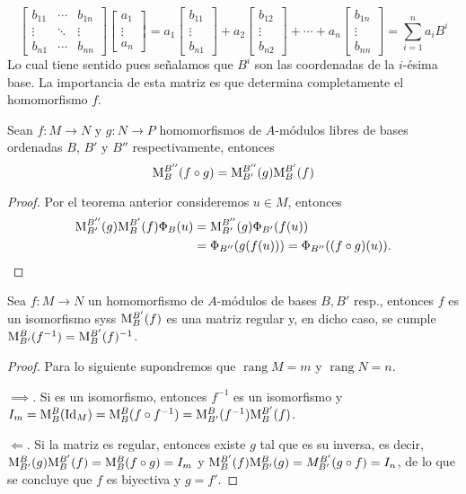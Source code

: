 \documentclass[11pt,oneside]{book}
\DeclareMathOperator{\rang}{rang}
\DeclareMathOperator{\Id}{Id}
\begin{document}
$$\begin{bmatrix}
b_{11} & \cdots & b_{1n}\\
\vdots & \ddots & \vdots\\
b_{n1} & \cdots & b_{nn}
\end{bmatrix}
\begin{bmatrix}
a_1\\\vdots\\a_n
\end{bmatrix}
=
a_1\begin{bmatrix}
b_{11}\\\vdots\\b_{n1}
\end{bmatrix}+
a_2\begin{bmatrix}
b_{12}\\\vdots\\b_{n2}
\end{bmatrix}+\cdots+
a_n\begin{bmatrix}
b_{1n}\\\vdots\\b_{nn}
\end{bmatrix}
=\sum_{i=1}^n a_iB^i$$
Lo cual tiene sentido pues señalamos que $B^i$ son las coordenadas de la $i$-ésima base. La importancia de esta matriz es que determina completamente el homomorfismo $f$.
\begin{thm}
Sean $f:M\rightarrow N$ y $g:N\rightarrow P$ homomorfismos de $A$-módulos libres de bases ordenadas $B$, $B'$ y $B''$ respectivamente, entonces
$${\rm M}_B^{B''}(f\circ g)={\rm M}_{B'}^{B''}(g){\rm M}_B^{B'}(f)$$
\end{thm}
\begin{proof}
Por el teorema anterior consideremos $u\in M$, entonces
\begin{align*}
{\rm M}_{B'}^{B''}(g){\rm M}_B^{B'}(f)\Phi_B(u)&={\rm M}_{B'}^{B''}(g)\Phi_{B'}(f(u))\\
&=\Phi_{B''}(g(f(u)))=\Phi_{B''}((f\circ g)(u)).
\end{align*}
\end{proof}
\begin{thm}
Sea $f:M\rightarrow N$ un homomorfismo de $A$-módulos de bases $B,B'$ resp., entonces $f$ es un isomorfismo syss ${\rm M}_B^{B'}(f)$ es una matriz regular y, en dicho caso, se cumple ${\rm M}_{B'}^B(f^{-1})={\rm M}_B^{B'}(f)^{-1}$.
\end{thm}
\begin{proof}
Para lo siguiente supondremos que $\rang M=m$ y $\rang N=n$.

$\implies$. Si es un isomorfismo, entonces $f^{-1}$ es un isomorfismo y $I_m={\rm M}_B^B(\Id_M)={\rm M}_B^B(f\circ f^{-1})={\rm M}_{B'}^B(f^{-1}){\rm M}_B^{B'}(f)$.

$\Longleftarrow$. Si la matriz es regular, entonces existe $g$ tal que es su inversa, es decir, ${\rm M}_{B'}^B(g){\rm M}_B^{B'}(f)={\rm M}_B^B(f\circ g)=I_m$ y ${\rm M}_B^{B'}(f){\rm M}_{B'}^B(g)=M_{B'}^{B'}(g\circ f)=I_n$, de lo que se concluye que $f$ es biyectiva y $g=f'$.
\end{proof}
\end{document}
